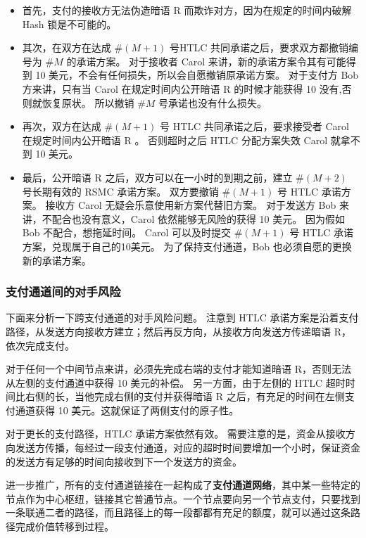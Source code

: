\begin{itemize}
  \item 首先，支付的接收方无法伪造暗语 R 而欺诈对方，因为在规定的时间内破解 Hash 锁是不可能的。

  \item 其次，在双方在达成 $\#(M+1)$ 号HTLC 共同承诺之后，要求双方都撤销编号为 $\#M$ 的承诺方案。
        对于接收者 Carol 来讲，新的承诺方案令其有可能得到 10 美元，不会有任何损失，所以会自愿撤销原承诺方案。
        对于支付方 Bob 方来讲，只有当 Carol 在规定时间内公开暗语 R 的时候才能获得 10 没有,否则就恢复原状。
        所以撤销 $\#M$ 号承诺也没有什么损失。

  \item 再次，双方在达成  $\#(M+1)$ 号 HTLC 共同承诺之后，要求接受者 Carol 在规定时间内公开暗语 R 。
        否则超时之后 HTLC 分配方案失效 Carol 就拿不到 10 美元。

  \item 最后，公开暗语 R 之后，双方可以在一小时的到期之前，建立 $\#(M+2)$ 号长期有效的 RSMC 承诺方案。
        双方要撤销 $\#(M+1)$ 号 HTLC 承诺方案。
        接收方 Carol 无疑会乐意使用新方案代替旧方案。
        对于发送方 Bob 来讲，不配合也没有意义，Carol 依然能够无风险的获得 10 美元。
        因为假如 Bob 不配合，想拖延时间。
        Carol 可以及时提交 $\#(M+1)$ 号 HTLC 承诺方案，兑现属于自己的10美元。
        为了保持支付通道，Bob 也必须自愿的更换新的承诺方案。

\end{itemize}

\subsubsection{支付通道间的对手风险}
下面来分析一下跨支付通道的对手风险问题。
注意到 HTLC 承诺方案是沿着支付路径，从发送方向接收方建立；然后再反方向，从接收方向发送方传递暗语 R，依次完成支付。

对于任何一个中间节点来讲，必须先完成右端的支付才能知道暗语 R，否则无法从左侧的支付通道中获得 10 美元的补偿。
另一方面，由于左侧的 HTLC 超时时间比右侧的长，当他完成右侧的支付并获得暗语 R 之后，有充足的时间在左侧支付通道获得 10 美元。这就保证了两侧支付的原子性。

对于更长的支付路径，HTLC 承诺方案依然有效。
需要注意的是，资金从接收方向发送方传播，每经过一段支付通道，对应的超时时间要增加一个小时，保证资金的发送方有足够的时间向接收到下一个发送方的资金。

进一步推广，所有的支付通道链接在一起构成了\textbf{支付通道网络}，其中某一些特定的节点作为中心枢纽，链接其它普通节点。一个节点要向另一个节点支付，只要找到一条联通二者的路径，而且路径上的每一段都都有充足的额度，就可以通过这条路径完成价值转移到过程。

